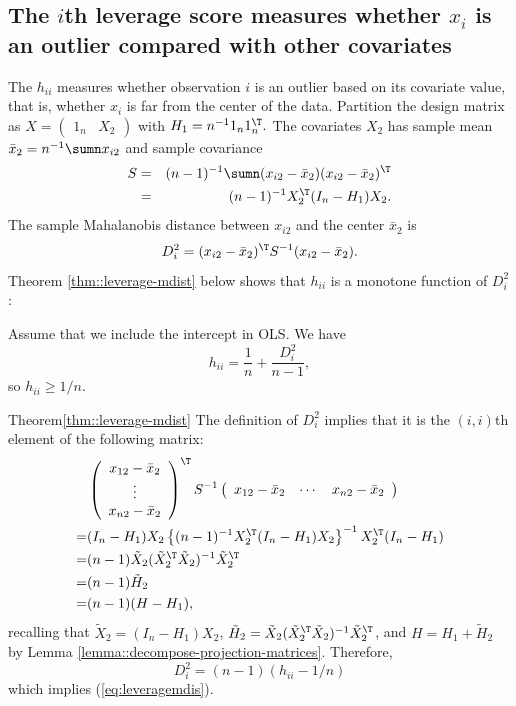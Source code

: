 \subsection{The $i$th leverage score measures whether
$x_i$ is an outlier compared with other covariates}


The $h_{ii}$ measures whether
observation $i$ is an outlier based on its covariate value, that
is, whether $x_{i}$ is far from the center of the data. Partition the
design matrix as $X=\left(\begin{array}{cc}
1_{n} & X_{2}\end{array}\right)$ with $H_{1}=n^{-1}1_{n}1_{n}^{\T}.$ The covariates $X_{2}$ has sample mean $\bar{x}_{2}=n^{-1}\sumn x_{i2}$ and sample covariance 
\begin{eqnarray*}
S  
&=&  (n-1)^{-1}\sumn(x_{i2}-\bar{x}_{2})(x_{i2}-\bar{x}_{2})^{\T} \\
&=& (n-1)^{-1}X_{2}^{\T}(I_{n}-H_{1})X_{2}.
\end{eqnarray*}
The sample Mahalanobis distance between $x_{i2}$ and the center $\bar{x}_{2}$
is 
\[
D_{i}^{2}=(x_{i2}-\bar{x}_{2})^{\T}S^{-1}(x_{i2}-\bar{x}_{2}).
\]
Theorem \ref{thm::leverage-mdist} below shows that $h_{ii}$ is a monotone function
of $D_{i}^{2}$:

\begin{theorem}\label{thm::leverage-mdist}
Assume that we include the intercept in OLS.
We have 
\begin{equation}
 h_{ii}= \frac{1}{n} + \frac{D_{i}^{2}}{n-1}  ,\label{eq:leveragemdis}
\end{equation}
so $h_{ii} \geq 1/n$. 
\end{theorem}


\begin{myproof}{Theorem}{\ref{thm::leverage-mdist}}
The definition of $D_{i}^{2}$ implies that it is the $(i,i)$th element
of the following matrix:
\begin{align*}
 & \left(\begin{array}{c}
x_{12}-\bar{x}_{2}\\
\vdots\\
x_{n2}-\bar{x}_{2}
\end{array}\right)^{\T}S^{-1}\left(\begin{array}{ccc}
x_{12}-\bar{x}_{2} & \cdots & x_{n2}-\bar{x}_{2}\end{array}\right)\\
= & (I_{n}-H_{1})X_{2}\left\{ (n-1)^{-1}X_{2}^{\T}(I_{n}-H_{1})X_{2}\right\} ^{-1}X_{2}^{\T}(I_{n}-H_{1})\\
= &(n-1)\tilde{X}_{2}(\tilde{X}_{2}^{\T}\tilde{X}_{2})^{-1}\tilde{X}_{2}^{\T}\\
= &(n-1)\tilde{H}_{2}\\
= &(n-1)(H-H_{1}),
\end{align*}
recalling that $\tilde{X}_2 = (I_n - H_1) X_2$, $\tilde{H}_2 = \tilde{X}_2 (\tilde{X}_2^{\T} \tilde{X}_2)^{-1} \tilde{X}_2^{\T}$, and $H = H_1 + \tilde{H}_{2}$ by Lemma \ref{lemma::decompose-projection-matrices}. 
Therefore, 
\[
D_{i}^{2}=(n-1) (h_{ii}-1/n)
\]
which implies (\ref{eq:leveragemdis}).
\end{myproof}


